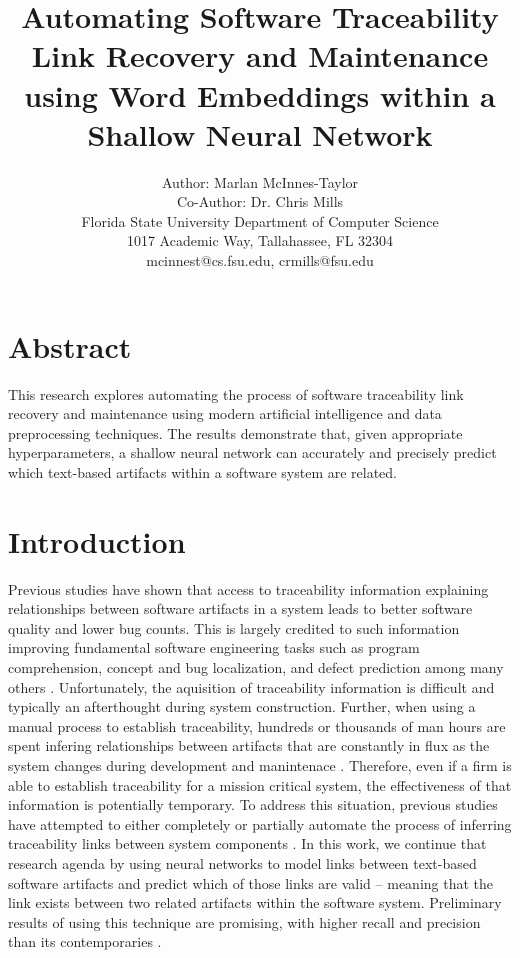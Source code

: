 \documentclass{article}
\title{Automating Software Traceability Link Recovery and Maintenance using Word Embeddings within a Shallow Neural Network}
\author{Author: Marlan McInnes-Taylor\\Co-Author: Dr. Chris Mills\\Florida State University Department of Computer Science\\1017 Academic Way, Tallahassee, FL 32304\\mcinnest@cs.fsu.edu, crmills@fsu.edu}
\date{}
\begin{document}
\maketitle

\section{Abstract}
This research explores automating the process of software traceability link recovery and maintenance using modern artificial intelligence and data preprocessing techniques. The results demonstrate that, given appropriate hyperparameters, a shallow neural network can accurately and precisely predict which text-based artifacts within a software system are related.

\section{Introduction}
    Previous studies have shown that access to traceability information explaining relationships between software artifacts in a system leads to better software quality and lower bug counts. This is largely credited to such information improving fundamental software engineering tasks such as program comprehension, concept and bug localization, and defect prediction among many others \cite{bouillon2013survey, mader2015developers, mader2016preventing}. Unfortunately, the aquisition of traceability information is difficult and typically an afterthought during system construction. Further, when using a manual process to establish traceability, hundreds or thousands of man hours are spent infering relationships between artifacts that are constantly in flux as the system changes during development and manintenace \cite{james1997automatic, weidenhaupt1998scenarios, antoniol2000traceability}. Therefore, even if a firm is able to establish traceability for a mission critical system, the effectiveness of that information is potentially temporary. To address this situation, previous studies have attempted to either completely or partially automate the process of inferring traceability links between system components \cite{borg2014recovering}. In this work, we continue that research agenda by using neural networks to model links between text-based software artifacts and predict which of those links are valid -- meaning that the link exists between two related artifacts within the software system. Preliminary results of using this technique are promising, with higher recall and precision than its contemporaries \cite{mills2018automatic, mills2019tracing}.
\end{document}
